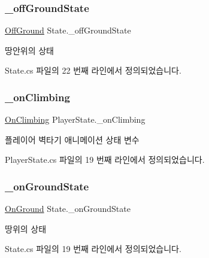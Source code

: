 \subsubsection{\texorpdfstring{\_offGroundState}{\_offGroundState}}
{\footnotesize\ttfamily \mbox{\hyperlink{class_state_a7d945e793324c017a973205564cf1a56}{Off\+Ground}} State.\+\_\+off\+Ground\+State\hspace{0.3cm}{\ttfamily [inherited]}}



땅안위의 상태 



State.\+cs 파일의 22 번째 라인에서 정의되었습니다.

\mbox{\label{class_player_state_a779507cee79095e3bbd9e6e1f7f8b8a8}} 
\subsubsection{\texorpdfstring{\_onClimbing}{\_onClimbing}}
{\footnotesize\ttfamily \mbox{\hyperlink{class_player_state_a16e115e2b4c8d0420119d6ff2fe8b3bc}{On\+Climbing}} Player\+State.\+\_\+on\+Climbing\hspace{0.3cm}{\ttfamily [private]}}



플레이어 벽타기 애니메이션 상태 변수 



Player\+State.\+cs 파일의 19 번째 라인에서 정의되었습니다.

\mbox{\label{class_state_ab3170df5e58f541f39edff3c1278d443}} 
\subsubsection{\texorpdfstring{\_onGroundState}{\_onGroundState}}
{\footnotesize\ttfamily \mbox{\hyperlink{class_state_ab9eb1c1d81f1903b8486d1275e78b68e}{On\+Ground}} State.\+\_\+on\+Ground\+State\hspace{0.3cm}{\ttfamily [inherited]}}



땅위의 상태 



State.\+cs 파일의 19 번째 라인에서 정의되었습니다.

